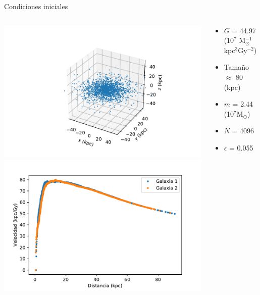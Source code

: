 \documentclass[handout]{beamer}
\begin{document}
\begin{frame}{Condiciones iniciales}
	\begin{columns}
		\begin{column}{0.5\textwidth}
			\includegraphics[height=0.35\textheight]{sources/images/galaxy_shape.pdf}\\
			\includegraphics[height=0.35\textheight]{sources/images/rotation_curve.pdf}
		\end{column}
		\begin{column}{0.65\textwidth}
			\footnotesize
			\begin{itemize}
				\item $G$ = 44.97 (10$^7$ M$_{\odot}^{-1}$kpc$^3$Gy$^{-2}$)
				\item Tama\~no $\approx$ 80 (kpc)
				\item $m$ = 2.44 (10$^7$M$_{\odot}$)
				\item $N$ = 4096
				\item $\epsilon$ = 0.055
			\end{itemize}
		\end{column}
	\end{columns}
\end{frame}
\end{document}
